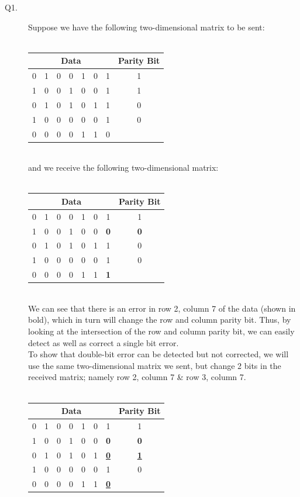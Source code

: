 \documentclass{csc_assignment}
\begin{document}
\begin{description}

\item[Q1.]
Suppose we have the following two-dimensional matrix to be sent: \\\\
\begin{tabular}{ |ccccccc|c| }
\hline
	\multicolumn{7}{|c|}{Data} & Parity Bit \\
	\hline
	0 & 1 & 0 & 0 & 1 & 0 & 1 & 1 \\
	1 & 0 & 0 & 1 & 0 & 0 & 1 & 1 \\
	0 & 1 & 0 & 1 & 0 & 1 & 1 & 0 \\
	1 & 0 & 0 & 0 & 0 & 0 & 1 & 0 \\
	\hline
	0 & 0 & 0 & 0 & 1 & 1 & 0 &   \\
\hline
\end{tabular} \\

and we receive the following two-dimensional matrix: \\\\
\begin{tabular}{ |ccccccc|c| }
\hline
	\multicolumn{7}{|c|}{Data} & Parity Bit \\
	\hline
	0 & 1 & 0 & 0 & 1 & 0 & 1 & 1 \\
	1 & 0 & 0 & 1 & 0 & 0 & \textbf{0} & \textbf{0} \\
	0 & 1 & 0 & 1 & 0 & 1 & 1 & 0 \\
	1 & 0 & 0 & 0 & 0 & 0 & 1 & 0 \\
	\hline
	0 & 0 & 0 & 0 & 1 & 1 & \textbf{1} &   \\
\hline
\end{tabular} \\

We can see that there is an error in row 2, column 7 of the data (shown in bold), which in turn will change the row and column parity bit. Thus, by looking at the intersection of the row and column parity bit, we can easily detect as well as correct a single bit error. \\ To show that double-bit error can be detected but not corrected, we will use the same two-dimensional matrix we sent, but change 2 bits in the received matrix; namely row 2, column 7 \& row 3, column 7.  \\\\
\begin{tabular}{ |ccccccc|c| }
\hline
	\multicolumn{7}{|c|}{Data} & Parity Bit \\
	\hline
	0 & 1 & 0 & 0 & 1 & 0 & 1 & 1 \\
	1 & 0 & 0 & 1 & 0 & 0 & \textbf{0} & \textbf{0} \\
	0 & 1 & 0 & 1 & 0 & 1 & \textbf{\underline{0}} & \textbf{\underline{1}} \\
	1 & 0 & 0 & 0 & 0 & 0 & 1 & 0 \\
	\hline
	0 & 0 & 0 & 0 & 1 & 1 & \textbf{\underline{0}} &   \\
\hline
\end{tabular} \\


\end{description}
\end{document}
